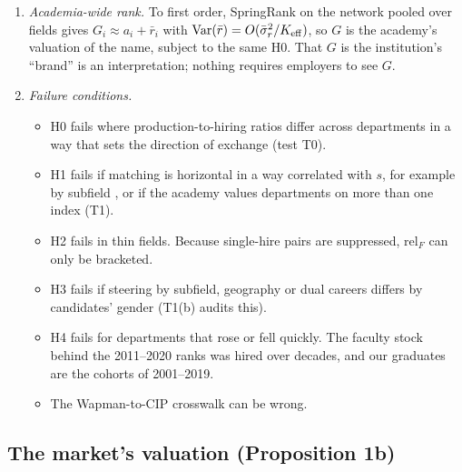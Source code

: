 \begin{enumerate}
department's PhDs only if one index drives both roles, sorting is vertical and volume does not set direction. If
T1 fails, only that reading is withdrawn: $F$ is then described as the ordering revealed by net placement, its
position in the hiring network. How a producer is valued depends on the categories its audience uses
\citep{zuckerman1999categorical}, which is one reason the two audiences are modelled separately.
\item \emph{Academia-wide rank.} To first order, SpringRank on the network pooled over fields gives
$G_i\approx a_i+\bar r_i$ with $\mathrm{Var}(\bar r)=O(\bar\sigma_r^2/K_{\rm eff})$, so $G$ is the academy's
valuation of the name, subject to the same H0. That $G$ is the institution's ``brand'' is an interpretation;
nothing requires employers to see $G$.
\item \emph{Failure conditions.}
\begin{itemize}
\item H0 fails where production-to-hiring ratios differ across departments in a way that sets the direction of
exchange (test T0).
\item H1 fails if matching is horizontal in a way correlated with $s$, for example by subfield
\citep{laberge2022subfield}, or if the academy values departments on more than one index (T1).
\item H2 fails in thin fields. Because single-hire pairs are suppressed, $\mathrm{rel}_F$ can only be bracketed.
\item H3 fails if steering by subfield, geography or dual careers differs by candidates' gender (T1(b) audits
this).
\item H4 fails for departments that rose or fell quickly. The faculty stock behind the 2011--2020 ranks was hired
over decades, and our graduates are the cohorts of 2001--2019.
\item The Wapman-to-CIP crosswalk can be wrong.
\end{itemize}
\end{enumerate}

\subsection{The market's valuation (Proposition 1b)}\label{si:theory:market}

